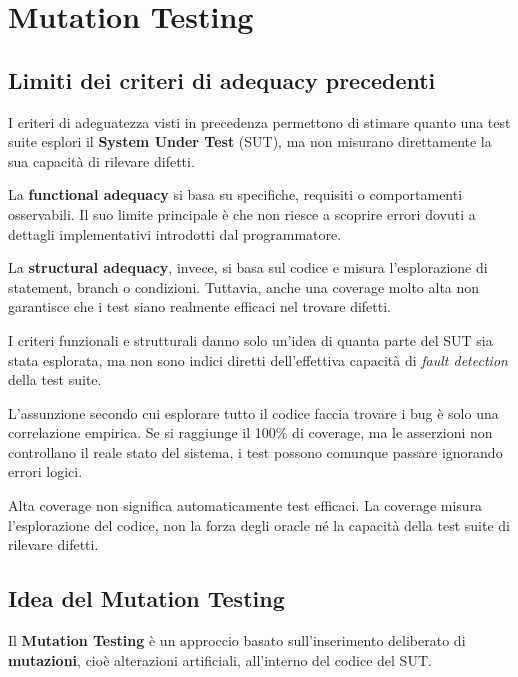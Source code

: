 \chapter{Mutation Testing}

\section{Limiti dei criteri di adequacy precedenti}

I criteri di adeguatezza visti in precedenza permettono di stimare quanto una test suite esplori il \textbf{System Under Test} (SUT), ma non misurano direttamente la sua capacità di rilevare difetti.

La \textbf{functional adequacy} si basa su specifiche, requisiti o comportamenti osservabili. Il suo limite principale è che non riesce a scoprire errori dovuti a dettagli implementativi introdotti dal programmatore.

La \textbf{structural adequacy}, invece, si basa sul codice e misura l'esplorazione di statement, branch o condizioni. Tuttavia, anche una coverage molto alta non garantisce che i test siano realmente efficaci nel trovare difetti.

\begin{notaslide}
I criteri funzionali e strutturali danno solo un'idea di quanta parte del SUT sia stata esplorata, ma non sono indici diretti dell'effettiva capacità di \emph{fault detection} della test suite.
\end{notaslide}

\begin{notaprof}
L'assunzione secondo cui esplorare tutto il codice faccia trovare i bug è solo una correlazione empirica. Se si raggiunge il 100\% di coverage, ma le asserzioni non controllano il reale stato del sistema, i test possono comunque passare ignorando errori logici.
\end{notaprof}

\begin{notaesame}
Alta coverage non significa automaticamente test efficaci. La coverage misura l'esplorazione del codice, non la forza degli oracle né la capacità della test suite di rilevare difetti.
\end{notaesame}

\section{Idea del Mutation Testing}

Il \textbf{Mutation Testing} è un approccio basato sull'inserimento deliberato di \textbf{mutazioni}, cioè alterazioni artificiali, all'interno del codice del SUT.

